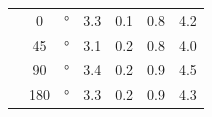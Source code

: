 \begin{tabular}{
  l S[table-format=3.0, table-number-alignment=right]@{}p{0.02\textwidth} |
  S S[table-format=-1.1] S[table-format=-1.1] | S
}
  \hline
       &   0 & $\unit{\degree}$                                                  & 3.3             & 0.1             & 0.8                         & 4.2 \rule{0pt}{2.3ex}       \\
                            &  45 & $\unit{\degree}$                                                  & 3.1             & 0.2             & 0.8                         & 4.0                         \\
                            &  90 & $\unit{\degree}$                                                  & 3.4             & 0.2             & 0.9                         & 4.5                         \\
                            & 180 & $\unit{\degree}$                                                  & 3.3             & 0.2             & 0.9                         & 4.3                         \\
  \bottomrule
\end{tabular}

